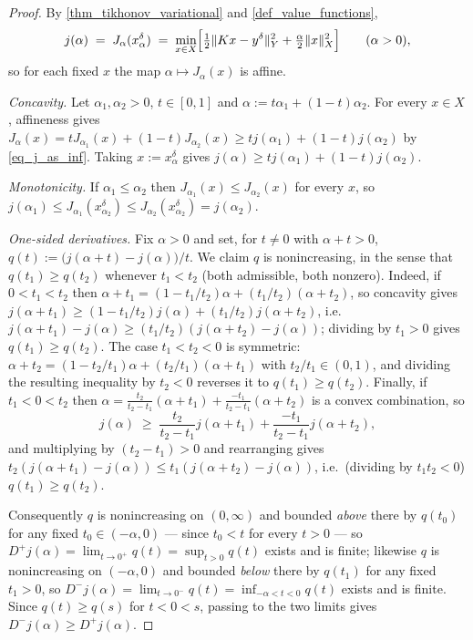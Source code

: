 \documentclass[a4paper]{report}
\theoremstyle{plain}
\theoremstyle{definition}
\theoremstyle{remark}
\begin{document}
\begin{proof}
  By \cref{thm_tikhonov_variational} and \cref{def_value_functions},
  \begin{equation}\label{eq_j_as_inf}
    j(\alpha) \;=\; J_{\alpha}(x^{\delta}_{\alpha}) \;=\; \min_{x \in X}
      \Bigl[\tfrac12\|Kx - y^{\delta}\|_Y^{2} + \tfrac{\alpha}{2}\|x\|_X^{2}\Bigr]
      \qquad (\alpha > 0),
  \end{equation}
  so for each fixed $x$ the map $\alpha \mapsto J_{\alpha}(x)$ is affine.

  \emph{Concavity.}  Let $\alpha_1,\alpha_2 > 0$, $t \in [0,1]$ and $\alpha :=
  t\alpha_1 + (1-t)\alpha_2$.  For every $x \in X$, affineness gives $J_{\alpha}(x) =
  tJ_{\alpha_1}(x) + (1-t)J_{\alpha_2}(x) \ge tj(\alpha_1) + (1-t)j(\alpha_2)$ by
  \eqref{eq_j_as_inf}.  Taking $x := x^{\delta}_{\alpha}$ gives $j(\alpha) \ge
  tj(\alpha_1) + (1-t)j(\alpha_2)$.

  \emph{Monotonicity.}  If $\alpha_1 \le \alpha_2$ then $J_{\alpha_1}(x) \le
  J_{\alpha_2}(x)$ for every $x$, so $j(\alpha_1) \le J_{\alpha_1}(x^{\delta}_{\alpha_2})
  \le J_{\alpha_2}(x^{\delta}_{\alpha_2}) = j(\alpha_2)$.

  \emph{One-sided derivatives.}  Fix $\alpha > 0$ and set, for $t \ne 0$ with $\alpha + t
  > 0$, $q(t) := \bigl(j(\alpha+t) - j(\alpha)\bigr)/t$.  We claim $q$ is nonincreasing,
  in the sense that $q(t_1) \ge q(t_2)$ whenever $t_1 < t_2$ (both admissible, both
  nonzero).  Indeed, if $0 < t_1 < t_2$ then $\alpha + t_1 = (1 - t_1/t_2)\alpha +
  (t_1/t_2)(\alpha+t_2)$, so concavity gives $j(\alpha+t_1) \ge (1-t_1/t_2)j(\alpha) +
  (t_1/t_2)j(\alpha+t_2)$, i.e.\ $j(\alpha+t_1) - j(\alpha) \ge (t_1/t_2)
  (j(\alpha+t_2)-j(\alpha))$; dividing by $t_1 > 0$ gives $q(t_1) \ge q(t_2)$.  The case
  $t_1 < t_2 < 0$ is symmetric: $\alpha + t_2 = (1-t_2/t_1)\alpha + (t_2/t_1)
  (\alpha+t_1)$ with $t_2/t_1 \in (0,1)$, and dividing the resulting inequality by
  $t_2 < 0$ reverses it to $q(t_1) \ge q(t_2)$.  Finally, if $t_1 < 0 < t_2$ then
  $\alpha = \frac{t_2}{t_2-t_1}(\alpha+t_1) + \frac{-t_1}{t_2-t_1}(\alpha+t_2)$ is a
  convex combination, so
  \[
    j(\alpha) \;\ge\; \frac{t_2}{t_2-t_1}j(\alpha+t_1)
      + \frac{-t_1}{t_2-t_1}j(\alpha+t_2) ,
  \]
  and multiplying by $(t_2-t_1)>0$ and rearranging gives $t_2(j(\alpha+t_1)-j(\alpha))
  \le t_1(j(\alpha+t_2)-j(\alpha))$, i.e.\ (dividing by $t_1t_2 < 0$) $q(t_1) \ge
  q(t_2)$.

  Consequently $q$ is nonincreasing on $(0,\infty)$ and bounded \emph{above} there by
  $q(t_0)$ for any fixed $t_0 \in (-\alpha,0)$ --- since $t_0 < t$ for every $t > 0$ ---
  so $D^{+}j(\alpha) = \lim_{t \to 0^{+}}q(t) = \sup_{t>0}q(t)$ exists and is finite;
  likewise $q$ is nonincreasing on $(-\alpha,0)$ and bounded \emph{below} there by
  $q(t_1)$ for any fixed $t_1 > 0$, so $D^{-}j(\alpha) = \lim_{t \to
  0^{-}}q(t) = \inf_{-\alpha<t<0}q(t)$ exists and is finite.  Since $q(t) \ge q(s)$ for
  $t < 0 < s$, passing to the two limits gives $D^{-}j(\alpha) \ge D^{+}j(\alpha)$.
\end{proof}
\end{document}
